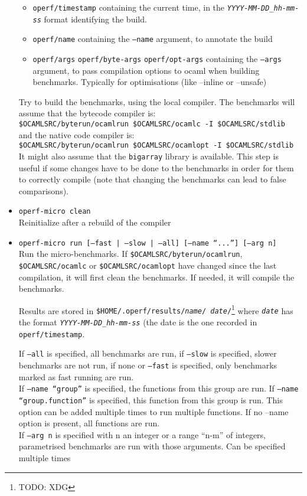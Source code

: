 \documentclass[11pt,a4paper]{article}
\begin{document}
\begin{itemize}
  \begin{itemize}
  \item {\tt operf/timestamp} containing the current time, in the
    {\tt\em YYYY-MM-DD\_hh-mm-ss} format identifying the build.
  \item {\tt operf/name} containing the {\tt --name} argument, to
    annotate the build
  \item {\tt operf/args} {\tt operf/byte-args} {\tt operf/opt-args}
    containing the {\tt --args} argument, to pass compilation options
    to ocaml when building benchmarks. Typically for optimisations
    (like --inline or --unsafe)
  \end{itemize}
  Try to build the benchmarks, using the local compiler. The benchmarks will
  assume that the bytecode compiler is:\\
  {\tt \$OCAMLSRC/byterun/ocamlrun \$OCAMLSRC/ocamlc -I \$OCAMLSRC/stdlib}\\
  and the native code compiler is:\\
  {\tt \$OCAMLSRC/byterun/ocamlrun \$OCAMLSRC/ocamlopt -I \$OCAMLSRC/stdlib}\\
  It might also assume that the {\tt bigarray} library is available.
  This step is useful if some changes have to be done to the benchmarks in
  order for them to correctly compile (note that changing the benchmarks
  can lead to false comparisons).
\item {\tt operf-micro clean}\\
  Reinitialize after a rebuild of the compiler
\item {\tt operf-micro run [--fast | --slow | --all] [--name ``...''] [--arg n]}\\
  Run the micro-benchmarks. If {\tt \$OCAMLSRC/byterun/ocamlrun},
  {\tt \$OCAMLSRC/ocamlc} or {\tt \$OCAMLSRC/ocamlopt} have changed since the
  last compilation, it will first clean the benchmarks. If needed, it will
  compile the benchmarks.

  Results are stored in {\tt \$HOME/.operf/results/{\em name}/{\em
      date}/}\footnote{TODO: XDG} where {\tt\em date} has the
  format {\tt\em YYYY-MM-DD\_hh-mm-ss} (the date is the one recorded
  in {\tt operf/timestamp}.

  If {\tt --all} is specified, all benchmarks are run, if {\tt --slow}
  is specified, slower benchmarks are not run, if none or
  {\tt --fast} is specified, only benchmarks marked as fast
  running are run. \\
  If {\tt --name ``group''} is specified, the functions from this
  group are run. If {\tt --name ``group.function''} is specified, this
  function from this group is run. This option can be added multiple
  times to run multiple functions. If no --name option is present, all
  functions are run. \\
  If {\tt --arg n} is specified with n an integer or a range ``n-m'' of
  integers, parametrised benchmarks are run with those arguments. Can
  be specified multiple times


\end{itemize}
\end{document}
